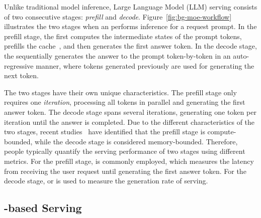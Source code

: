 
Unlike traditional \DL model inference, Large Language Model (LLM) serving consists of two consecutive stages: \textit{prefill} and \textit{decode}. Figure~\ref{fig:bg-moe-workflow} illustrates the two stages when an \LLM performs inference for a request prompt. 
% 
In the prefill stage, the \LLM first computes the intermediate \KV states of the prompt tokens, prefills the \KV cache~\cite{kwon2023efficient,liu2024cachegen,lee2024infinigen,zhong2024distserve,agrawal2024taming}, and then generates the first answer token. 
%
In the decode stage, the \LLM sequentially generates the answer to the prompt token-by-token in an auto-regressive manner, where tokens generated previously are used for generating the next token. 

The two stages have their own unique characteristics.  
%
The prefill stage only requires one \textit{iteration}, processing all tokens in parallel and generating the first answer token. 
%
The decode stage spans several iterations, generating one token per iteration until the answer is completed. 
% 
Due to the different characteristics of the two stages, recent studies~\cite{patel2024splitwise,zhong2024distserve} have identified that the prefill stage is compute-bounded, while the decode stage is considered memory-bounded. 
% 
Therefore, people typically quantify the serving performance of \LLM two stages using different metrics. 
%
For the prefill stage, \TTFT is commonly employed, which measures the latency from receiving the user request until generating the first answer token. 
%
For the decode stage, \TPS or \TPOT is used to measure the generation rate of \LLM serving.

\subsection{\MoE-based \LLM Serving}


